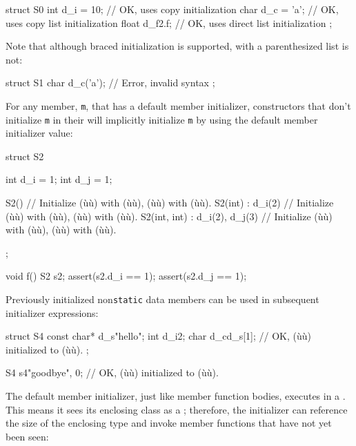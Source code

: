 \begin{emcppslisting}
struct S0
{
    int   d_i = 10;     // OK, uses copy initialization
    char  d_c = {'a'};  // OK, uses copy list initialization
    float d_f{2.f};     // OK, uses direct list initialization
};
\end{emcppslisting}
    

Note that although braced initialization is supported,  with a parenthesized list is not:

\begin{emcppslisting}
struct S1
{
    char d_c('a');  // Error, invalid syntax
};
\end{emcppslisting}
    

For any member, \lstinline!m!, that has a default member initializer,
constructors that don't initialize \lstinline!m! in their  will implicitly initialize \lstinline!m! by using the
default member initializer value:

\begin{emcppslisting}
struct S2
{
    int d_i = 1;
    int d_j = 1;

    S2() { }                           // Initialize (ù{}ù) with (ù{}ù), (ù{}ù) with (ù{}ù).
    S2(int) : d_i(2) { }               // Initialize (ù{}ù) with (ù{}ù), (ù{}ù) with (ù{}ù).
    S2(int, int) : d_i(2), d_j(3) { }  // Initialize (ù{}ù) with (ù{}ù), (ù{}ù) with (ù{}ù).
};

void f()
{
    S2 s2;
    assert(s2.d_i == 1);
    assert(s2.d_j == 1);
}
\end{emcppslisting}
    

Previously initialized non\lstinline!static! data members can be used in
subsequent initializer expressions:

\begin{emcppslisting}
struct S4
{
    const char* d_s{"hello"};
    int         d_i{2};
    char        d_c{d_s[1]};  // OK, (ù{}ù) initialized to (ù{}ù).
};

S4 s4{"goodbye", 0};          // OK, (ù{}ù) initialized to (ù{}ù).
\end{emcppslisting}
    

The default member initializer, just like member function bodies,
executes in a . This means it sees its
enclosing class as a ; therefore, the initializer
can reference the size of the enclosing type and invoke member functions
that have not yet been seen:


